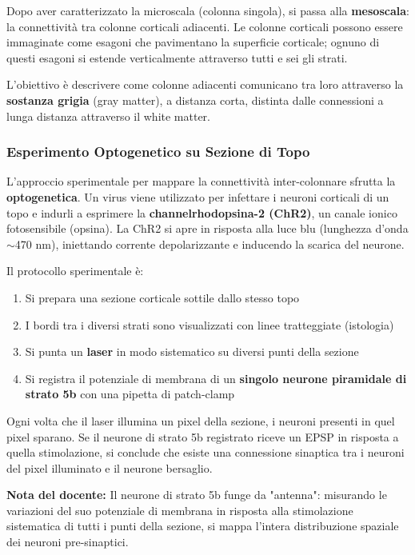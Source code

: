 Dopo aver caratterizzato la microscala (colonna singola), si passa alla \textbf{mesoscala}: la connettività tra colonne corticali adiacenti. Le colonne corticali possono essere immaginate come esagoni che pavimentano la superficie corticale; ognuno di questi esagoni si estende verticalmente attraverso tutti e sei gli strati.

L'obiettivo è descrivere come colonne adiacenti comunicano tra loro attraverso la \textbf{sostanza grigia} (gray matter), a distanza corta, distinta dalle connessioni a lunga distanza attraverso il white matter.

\subsubsection{Esperimento Optogenetico su Sezione di Topo}

L'approccio sperimentale per mappare la connettività inter-colonnare sfrutta la \textbf{optogenetica}. Un virus viene utilizzato per infettare i neuroni corticali di un topo e indurli a esprimere la \textbf{channelrhodopsina-2 (ChR2)}, un canale ionico fotosensibile (opsina). La ChR2 si apre in risposta alla luce blu (lunghezza d'onda $\sim$470 nm), iniettando corrente depolarizzante e inducendo la scarica del neurone.

Il protocollo sperimentale è:

\begin{enumerate}
    \item Si prepara una sezione corticale sottile dallo stesso topo
    \item I bordi tra i diversi strati sono visualizzati con linee tratteggiate (istologia)
    \item Si punta un \textbf{laser} in modo sistematico su diversi punti della sezione
    \item Si registra il potenziale di membrana di un \textbf{singolo neurone piramidale di strato 5b} con una pipetta di patch-clamp
\end{enumerate}

Ogni volta che il laser illumina un pixel della sezione, i neuroni presenti in quel pixel sparano. Se il neurone di strato 5b registrato riceve un EPSP in risposta a quella stimolazione, si conclude che esiste una connessione sinaptica tra i neuroni del pixel illuminato e il neurone bersaglio.

\begin{tcolorbox}[colback=gray!5, colframe=gray!40, arc=2mm, boxrule=0.5pt]
\textbf{Nota del docente:} Il neurone di strato 5b funge da "antenna": misurando le variazioni del suo potenziale di membrana in risposta alla stimolazione sistematica di tutti i punti della sezione, si mappa l'intera distribuzione spaziale dei neuroni pre-sinaptici.
\end{tcolorbox}


